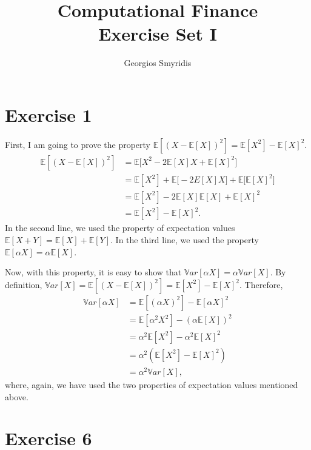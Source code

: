 \documentclass[11pt]{report}
\title{Computational Finance\\ Exercise Set I}
\author{Georgios Smyridis}
\begin{document}
\maketitle


\section*{Exercise 1}
First, I am going to prove the property $\mathbb{E}[(X-\mathbb{E}[X])^2]=\mathbb{E}[X^2]-\mathbb{E}[X]^2$.
\begin{align}
	\mathbb{E}[(X-\mathbb{E}[X])^2]&=\mathbb{E}\big[X^2-2\mathbb{E}[X]X+\mathbb{E}[X]^2\big]\nonumber\\
	&=\mathbb{E}[X^2]+\mathbb{E}\big[-2E[X]X\big]+\mathbb{E}\big[\mathbb{E}[X]^2\big]\nonumber\\
	&=\mathbb{E}[X^2]-2\mathbb{E}[X]\mathbb{E}[X]+\mathbb{E}[X]^2\nonumber\\
	&=\mathbb{E}[X^2]-\mathbb{E}[X]^2.\nonumber
\end{align}
In the second line, we used the property of expectation values $\mathbb{E}[X+Y]=\mathbb{E}[X]+\mathbb{E}[Y]$. In the third line, we used the property $\mathbb{E}[\alpha X]=\alpha\mathbb{E}[X]$.

Now, with this property, it is easy to show that $\mathbb{V}ar[\alpha X]=\alpha\mathbb{V}ar[X]$. By definition, $\mathbb{V}ar[X]=\mathbb{E}[(X-\mathbb{E}[X])^2]=\mathbb{E}[X^2]-\mathbb{E}[X]^2$. Therefore,
\begin{align}
	\mathbb{V}ar[\alpha X]&=\mathbb{E}[(\alpha X)^2]-\mathbb{E}[\alpha X]^2\nonumber\\
	&=\mathbb{E}[\alpha^2 X^2]-(\alpha\mathbb{E}[X])^2\nonumber\\
	&=\alpha^2\mathbb{E}[X^2]-\alpha^2\mathbb{E}[X]^2\nonumber\\
	&=\alpha^2(\mathbb{E}[X^2]-\mathbb{E}[X]^2)\nonumber\\
	&=\alpha^2\mathbb{V}ar[X],\nonumber
\end{align}
where, again, we have used the two properties of expectation values mentioned above.


\section*{Exercise 6}
\end{document}
